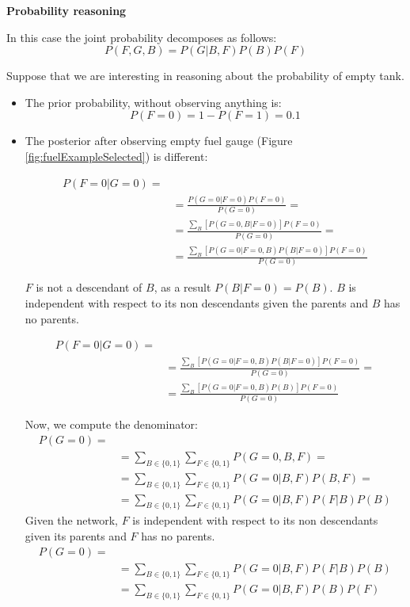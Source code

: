 \textbf{Probability reasoning} \newline

In this case the joint probability decomposes as follows:
$$P(F,G,B) = P(G | B,F)P(B)P(F)$$

Suppose that we are interesting in reasoning about the probability of empty tank.
\begin{itemize}
    \item The prior probability, without observing anything is:
    $$P(F=0) = 1 - P(F=1) = 0.1$$
    
    \item The posterior after observing empty fuel gauge (Figure \ref{fig:fuelExampleSelected}) is different:
    
    \begin{align*}
    P(F=0 | G=0) = \\
    &=\frac{P(G=0 | F=0) P(F=0)}{P(G=0)} =\\
    &=\frac{\sum_B [P(G=0,B | F=0)] P(F=0)}{P(G=0)} =\\
    &=\frac{\sum_B [P(G=0 | F=0, B) P(B|F=0)] P(F=0)}{P(G=0)}
    \end{align*}

    $F$ is not a descendant of $B$, as a result $P(B|F=0) = P(B)$. $B$ is independent with respect to its non descendants given the parents and $B$ has no parents.
    
    \begin{align*}
    P(F=0 | G=0) = \\
    &=\frac{\sum_B [P(G=0 | F=0, B) P(B|F=0)] P(F=0)}{P(G=0)} =\\
    &=\frac{\sum_B [P(G=0 | F=0, B) P(B)] P(F=0)}{P(G=0)}
    \end{align*}
    
    Now, we compute the denominator:
    \begin{align*}
    P(G=0) =\\
    &=\sum_{B \in \{0,1\}} \sum_{F \in \{0,1\}} P(G=0, B, F) =\\
    &= \sum_{B \in \{0,1\}} \sum_{F \in \{0,1\}} P(G=0 | B, F)P(B,F) = \\
    &= \sum_{B \in \{0,1\}} \sum_{F \in \{0,1\}} P(G=0 | B, F) P(F|B) P(B)
    \end{align*}
    Given the network, $F$ is independent with respect to its non descendants given its parents and $F$ has no parents.
    \begin{align*}
        P(G=0) =\\
        &= \sum_{B \in \{0,1\}} \sum_{F \in \{0,1\}} P(G=0 | B, F) P(F|B) P(B)\\
        &=\sum_{B \in \{0,1\}} \sum_{F \in \{0,1\}} P(G=0 | B, F)P(B)P(F)
    \end{align*}
    

\end{itemize}
